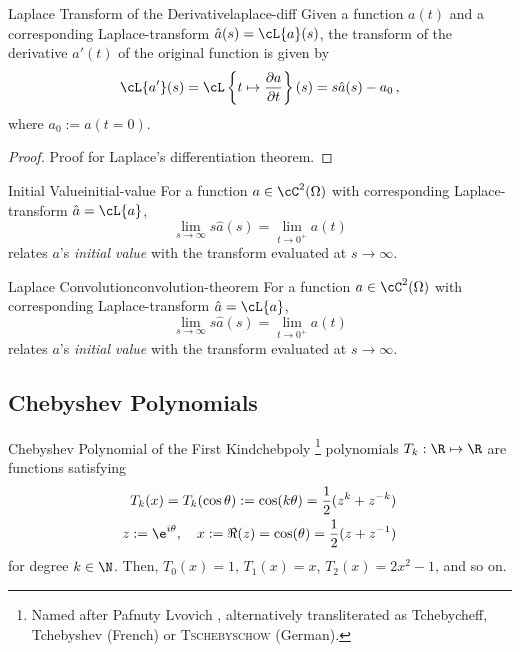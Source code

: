\documentclass{prettytex/ox/mmsc-special-topic}
\begin{document}
  \begin{theorem}{Laplace Transform of the Derivative}{laplace-diff}
    Given a function $a(t)$ and a corresponding Laplace-transform $\hat{a}(s) = \cL\{a\}(s)$, the transform of the derivative $a'(t)$ of the original function is given by
    $$\cL\{a'\}(s) = \cL\left\{t \mapsto \frac{\partial a}{\partial t}\right\}(s) = s\hat{a}(s) - a_0\,,$$
    where $a_0 := a(t=0)$.
  \end{theorem}

  \begin{proof}
    Proof for Laplace's differentiation theorem.
  \end{proof}

  \begin{theorem}{Initial Value}{initial-value}
    For a function $a \in \cC^2(\Omega)$ with corresponding Laplace-transform $\hat{a} = \cL\{a\}$,
    $$\lim_{s \rightarrow \infty} s \hat{a}(s) = \lim_{t \rightarrow 0^+} a(t)$$
    relates $a$'s \textit{initial value} with the transform evaluated at $s \rightarrow \infty$.
  \end{theorem}

  \begin{theorem}{Laplace Convolution}{convolution-theorem}
    For a function $a \in \cC^2(\Omega)$ with corresponding Laplace-transform $\hat{a} = \cL\{a\}$,
    $$\lim_{s \rightarrow \infty} s \hat{a}(s) = \lim_{t \rightarrow 0^+} a(t)$$
    relates $a$'s \textit{initial value} with the transform evaluated at $s \rightarrow \infty$.
  \end{theorem}

  \subsection{Chebyshev Polynomials}
  \begin{definition}{Chebyshev Polynomial of the First Kind}{chebpoly}
    \chebyshev\footnote{Named after Pafnuty Lvovich \chebyshev, alternatively transliterated as Tchebycheff, Tchebyshev (French) or \textsc{Tschebyschow} (German).} polynomials $T_k: \R \mapsto \R$ are functions satisfying
    \begin{align*}
      T_k(x) = T_k(\cos \theta) := \cos(k \theta) = \frac{1}{2} (z^k + z^{-k}) \\
      z := \e^{i \theta},\quad x := \Re(z) = \cos(\theta) = \frac{1}{2}(z + z^{-1})
    \end{align*}
    for degree $k \in \N$. Then, $T_0(x) = 1$, $T_1(x) = x$, $T_2(x) = 2x^2-1$, and so on.
  \end{definition}
\end{document}
